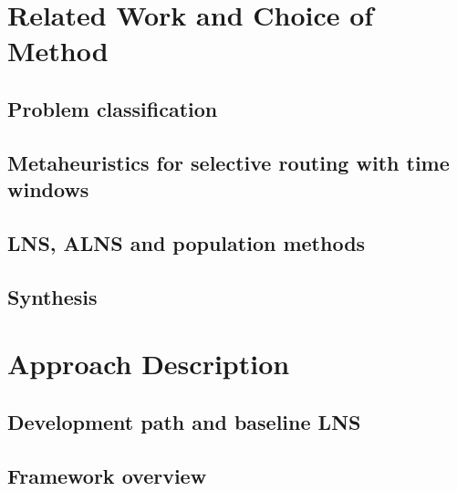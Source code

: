 \documentclass[10pt, a4paper]{article}
\begin{document}
\section{Related Work and Choice of Method}
\subsection{Problem classification}
\subsection{Metaheuristics for selective routing with time windows}
\subsection{LNS, ALNS and population methods}
\subsection{Synthesis}

\section{Approach Description}
\subsection{Development path and baseline LNS}
\subsection{Framework overview}
\end{document}

